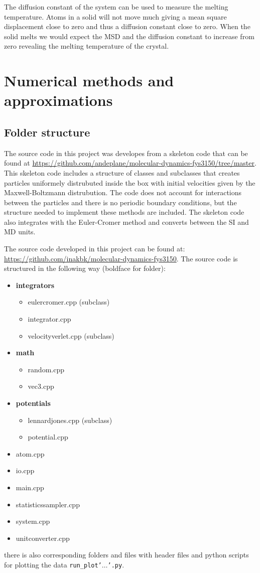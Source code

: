\documentclass[11pt,a4wide]{article}
\begin{document}
The diffusion constant of the system can be used to measure the melting temperature. Atoms in a solid will not move much giving a mean square displacement close to zero and thus a diffusion constant close to zero. When the solid melts we would expect the MSD and the diffusion constant to increase from zero revealing the melting temperature of the crystal. 


\section{Numerical methods and approximations}
\subsection{Folder structure}

The source code in this project was developes from a skeleton code that can be found at \url{https://github.com/andeplane/molecular-dynamics-fys3150/tree/master}. This skeleton code includes a structure of classes and subclasses that creates particles uniformely distrubuted inside the box with initial velocities given by the Maxwell-Boltzmann distrubution. The code does not account for  interactions between the particles and there is no periodic boundary conditions, but the structure needed to implement these methods are included. The skeleton code also integrates with the Euler-Cromer method and converts between the SI and MD units. 

The source code developed in this project can be found at: \url{https://github.com/inakbk/molecular-dynamics-fys3150}. The source code is structured in the following way (boldface for folder): 
\begin{itemize}
\item \textbf{integrators}
\begin{itemize}
\item eulercromer.cpp (subclass)
\item integrator.cpp
\item velocityverlet.cpp (subclass)
\end{itemize}
\item \textbf{math}
\begin{itemize}
\item random.cpp
\item vec3.cpp
\end{itemize}
\item \textbf{potentials}
\begin{itemize}
\item lennardjones.cpp (subclass)
\item potential.cpp
\end{itemize}
\item atom.cpp
\item io.cpp
\item main.cpp
\item statisticssampler.cpp
\item system.cpp
\item unitconverter.cpp
\end{itemize}
there is also corresponding folders and files with header files and python scripts for plotting the data \texttt{run\_plot'$\dots$'.py}. 
\end{document}
